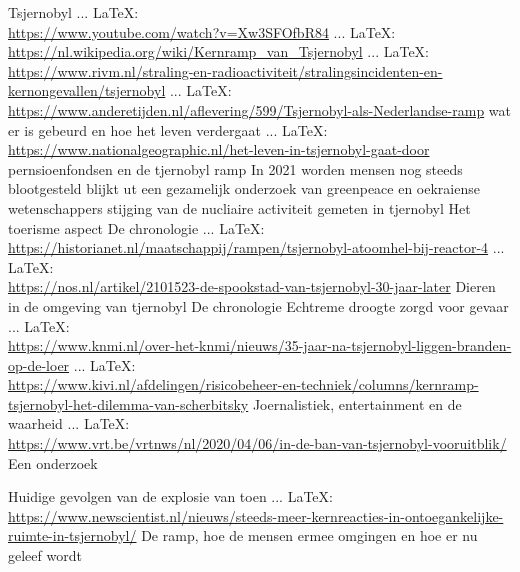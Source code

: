 \begin{thebibliography}{99}
{{{{{{{							
							
							
							Tsjernobyl
							 ... \LaTeX:\\ \url{https://www.youtube.com/watch?v=Xw3SFOfbR84}
							 ... \LaTeX:\\ \url{https://nl.wikipedia.org/wiki/Kernramp_van_Tsjernobyl}
							 ... \LaTeX:\\ \url{https://www.rivm.nl/straling-en-radioactiviteit/stralingsincidenten-en-kernongevallen/tsjernobyl}
							 ... \LaTeX:\\ \url{https://www.anderetijden.nl/aflevering/599/Tsjernobyl-als-Nederlandse-ramp}
							wat er is gebeurd en hoe het leven verdergaat
							 ... \LaTeX:\\ \url{https://www.nationalgeographic.nl/het-leven-in-tsjernobyl-gaat-door}
							pernsioenfondsen en de tjernobyl ramp
							In 2021 worden mensen nog steeds blootgesteld blijkt ut een gezamelijk onderzoek van greenpeace en oekraiense wetenschappers
							stijging van de nucliaire activiteit gemeten in tjernobyl
							Het toerisme  aspect
							De chronologie
							 ... \LaTeX:\\ \url{https://historianet.nl/maatschappij/rampen/tsjernobyl-atoomhel-bij-reactor-4}
							 ... \LaTeX:\\ \url{https://nos.nl/artikel/2101523-de-spookstad-van-tsjernobyl-30-jaar-later}
							Dieren in de omgeving van tjernobyl
							De chronologie
							Echtreme droogte zorgd voor gevaar
							 ... \LaTeX:\\ \url{https://www.knmi.nl/over-het-knmi/nieuws/35-jaar-na-tsjernobyl-liggen-branden-op-de-loer}
							 ... \LaTeX:\\ \url{https://www.kivi.nl/afdelingen/risicobeheer-en-techniek/columns/kernramp-tsjernobyl-het-dilemma-van-scherbitsky}
							Joernalistiek, entertainment en de waarheid
							 ... \LaTeX:\\ \url{https://www.vrt.be/vrtnws/nl/2020/04/06/in-de-ban-van-tsjernobyl-vooruitblik/}
							Een onderzoek
							
							Huidige gevolgen van de explosie van toen
							 ... \LaTeX:\\ \url{https://www.newscientist.nl/nieuws/steeds-meer-kernreacties-in-ontoegankelijke-ruimte-in-tsjernobyl/}
							De ramp, hoe de mensen ermee omgingen en hoe er nu geleef wordt
							
}}}}}}}
\end{thebibliography}
